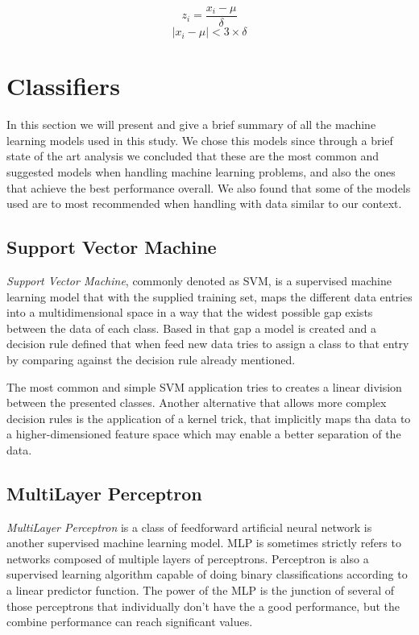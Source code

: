 \documentclass[conference]{IEEEtran}
\begin{document}
\begin{multicols}{2}
    \begin{equation}\label{zscore}
        z_{i} = \frac{x_{i} - \mu}{\delta}
    \end{equation}
    \break
    \begin{equation}\label{outliers}
        |x_{i}-\mu| < 3\times\delta
    \end{equation}
\end{multicols}

\section{Classifiers}\label{classifiers}
In this section we will present and give a brief summary of all the machine learning models used in this study. We chose this models since through a brief state of the art analysis we concluded that these are the most common and suggested models when handling machine learning problems, and also the ones that achieve the best performance overall. We also found that some of the models used are to most recommended when handling with data similar to our context.

\subsection{Support Vector Machine}
\textit{Support Vector Machine}, commonly denoted as SVM, is a supervised machine learning model that with the supplied training set, maps the different data entries into a multidimensional space in a way that the widest possible gap exists between the data of each class. Based in that gap a model is created and a decision rule defined that when feed new data tries to assign a class to that entry by comparing against the decision rule already mentioned.

The most common and simple SVM application tries to creates a linear division between the presented classes. Another alternative that allows more complex decision rules is the application of a kernel trick, that implicitly maps tha data to a higher-dimensioned feature space which may enable a better separation of the data.

\subsection{MultiLayer Perceptron}
\textit{MultiLayer Perceptron} is a class of feedforward artificial neural network is another supervised machine learning model. MLP is sometimes strictly refers to networks composed of multiple layers of perceptrons. Perceptron is also a supervised learning algorithm capable of doing binary classifications according to a linear predictor function. The power of the MLP is the junction of several of those perceptrons that individually don't have the a good performance, but the combine performance can reach significant values.
\end{document}

